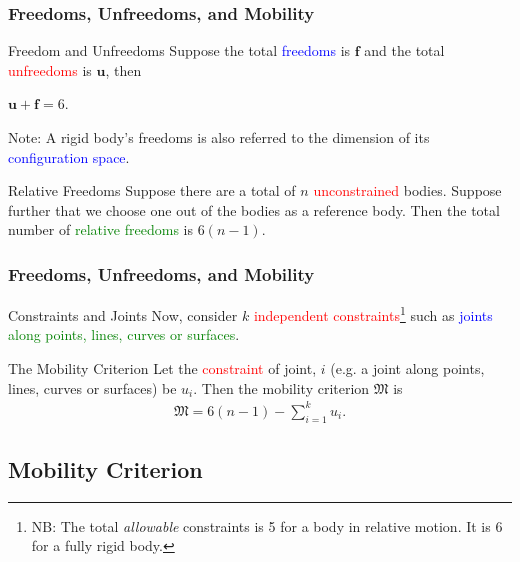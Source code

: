 \begin{frame}
	\frametitle{Freedoms, Unfreedoms, and Mobility}
	\begin{block}{Freedom and Unfreedoms}
		Suppose the total \textcolor{blue}{freedoms} is $\bm{f}$ and the total \textcolor{red}{unfreedoms} is $\bm{u}$, then
		\begin{description}
			\item $\bm{u}+\bm{f}=6.$
			\label{eq:freedomunfreedom}
		\end{description}
	Note: A rigid body's freedoms is also referred to the dimension of  its \textcolor{blue}{configuration space}.
	\end{block}
	\begin{block}{Relative Freedoms}
		Suppose there are a total of $n$ \textcolor{red}{unconstrained} bodies. Suppose further that we choose one out of the bodies as a reference body. Then the total number of \textcolor{green}{relative freedoms} is $6(n-1)$.
	\end{block}
\end{frame}

\begin{frame}
	\frametitle{Freedoms, Unfreedoms, and Mobility}
	\begin{block}{Constraints and Joints}
		Now, consider $k$ \textcolor{red}{independent constraints}\footnote{NB: The total \textit{allowable} constraints is 5 for a body in relative motion. It is 6 for a fully rigid body.} such as \textcolor{blue}{joints} \textcolor{green}{along points, lines, curves or surfaces}.
	\end{block}
	
	\begin{block}{The Mobility Criterion}
		Let the \textcolor{red}{constraint} of joint, $i$ (e.g. a joint along points, lines, curves or surfaces) be $u_i$. Then the mobility criterion $\mathfrak{M}$ is
		\begin{align}
			\mathfrak{M}=6(n-1) - \sum_{i=1}^{k}u_i.
		\end{align}
	\end{block}
\end{frame}

\subsection{Mobility Criterion}

